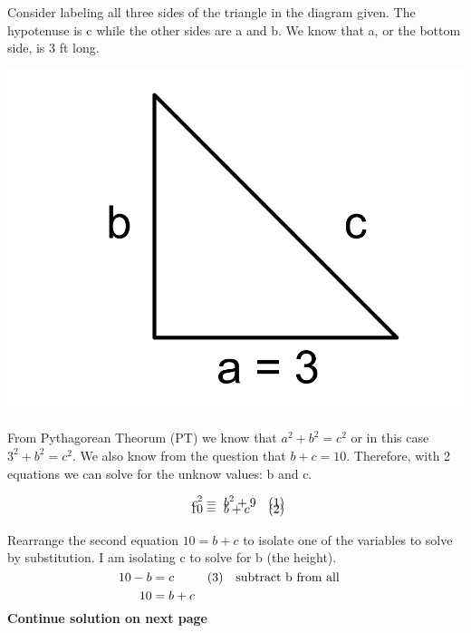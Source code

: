 \documentclass[12pt]{book}
\begin{document}
\begin{enumerate}
Consider labeling all three sides of the triangle in the diagram given. The hypotenuse is c while the other sides are a and b. We know that a, or the bottom side, is 3 ft long.
\begin{center}
\includegraphics[scale = 0.2]{A1-3 Diagram.png}
\end{center}

From Pythagorean Theorum (PT) we know that $a^2 + b^2 = c^2$ or in this case $3^2 + b^2 = c^2$. 
We also know from the question that $b+c = 10$. Therefore, with 2 equations we can solve for the unknow values: b and c.

\vspace{-1.5em}
\begin{align*}
    \text{\space} c^2 & = \text{\space} b^2 + 9 && (1)\\[-1em]
    \text{\space} 10 & = \text{\space} b + c && (2)
\end{align*}

Rearrange the second equation $10 = b + c$ to isolate one of the variables to solve by substitution. I am isolating c to solve for b (the height).

\begin{align*}
    10 & = b + c \\
    \\[-4.5em]
    10 - b & = c && \text{(3) \space \space subtract b from all}
\end{align*}

\vspace{0.2em}
\begin{center}
    \textbf{Continue solution on next page}\\
\end{center}


\end{enumerate}
\end{document}
